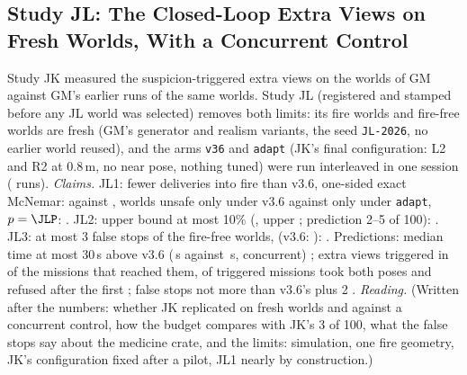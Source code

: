 \subsection{Study JL: The Closed-Loop Extra Views on Fresh Worlds, With a Concurrent Control}\label{sec:moved-jl}
Study JK measured the suspicion-triggered extra views on the worlds of GM against GM's earlier runs of the same worlds. Study JL (registered and stamped before any JL world was selected) removes both limits: its \JLWorlds{} fire worlds and \JLPlain{} fire-free worlds are fresh (GM's generator and realism variants, the seed \texttt{JL-2026}, no earlier world reused), and the arms \texttt{v36} and \texttt{adapt} (JK's final configuration: L2 and R2 at 0.8\,m, no near pose, nothing tuned) were run interleaved in one session (\JLTrials{} runs).
\emph{Claims.} JL1: fewer deliveries into fire than v3.6, one-sided exact McNemar: \JLAdapt{} against \JLV{}, \JLOnlyV{} worlds unsafe only under v3.6 against \JLOnlyAdapt{} only under \texttt{adapt}, $p=\JLP$: \JLOneHolds. JL2: upper bound at most 10\% (\JLAdaptRate{}, upper \JLAdaptUpper; prediction 2--5 of 100): \JLTwoHolds. JL3: at most 3 false stops of the fire-free worlds, \JLFalseStops{} (v3.6: \JLFalseStopsV): \JLThreeHolds. Predictions: median time at most 30\,s above v3.6 (\JLTimeAdapt\,s against \JLTimeV\,s, concurrent) \JLPredOneHolds; extra views triggered in \JLTriggerShare{} of the \JLReached{} missions that reached them, \JLAllExtras{} of \JLTriggered{} triggered missions took both poses and \JLRefusedEarly{} refused after the first \JLPredTwoHolds; false stops not more than v3.6's plus 2 \JLPredThreeHolds.
\emph{Reading.} (Written after the numbers: whether JK replicated on fresh worlds and against a concurrent control, how the budget compares with JK's 3 of 100, what the false stops say about the medicine crate, and the limits: simulation, one fire geometry, JK's configuration fixed after a pilot, JL1 nearly by construction.)
